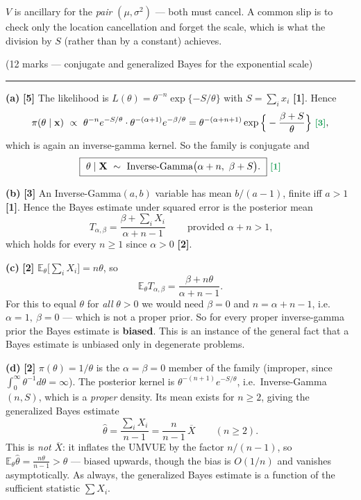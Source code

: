 \documentclass[11pt]{article}
\newcommand{\E}{\mathbb{E}}
\newcommand{\Xbar}{\overline{X}}
\newcommand{\mk}[1]{{\small\color{ForestGreen}\textbf{[#1]}}}
\newcommand{\qhead}[2]{\bigskip\noindent{\large\bfseries Question #1}\quad\textnormal{\small(#2)}\par
  \vspace{2pt}\hrule\vspace{6pt}}
\begin{document}
\begin{trapbox}
$V$ is ancillary for the \emph{pair} $(\mu,\sigma^2)$ --- both must cancel. A common slip is
to check only the location cancellation and forget the scale, which is what the division by
$S$ (rather than by a constant) achieves.
\end{trapbox}

\qhead{5}{12 marks --- conjugate and generalized Bayes for the exponential scale}

\noindent\textbf{(a)} \mk{5}
The likelihood is $L(\theta)=\theta^{-n}\exp\{-S/\theta\}$ with $S=\sum_ix_i$ \mk{1}. Hence
\[
\pi(\theta\mid\mathbf x)\ \propto\ \theta^{-n}e^{-S/\theta}\cdot\theta^{-(\alpha+1)}e^{-\beta/\theta}
=\theta^{-(\alpha+n+1)}\exp\Big\{-\frac{\beta+S}{\theta}\Big\}\ \mk{3},
\]
which is again an inverse-gamma kernel. So the family is conjugate and
\[
\boxed{\ \theta\mid\mathbf X\ \sim\ \text{Inverse-Gamma}\big(\alpha+n,\ \beta+S\big).\ }\ \mk{1}
\]

\smallskip\noindent\textbf{(b)} \mk{3}
An Inverse-Gamma$(a,b)$ variable has mean $b/(a-1)$, finite iff $a>1$ \mk{1}. Hence the Bayes
estimate under squared error is the posterior mean
\[
\boxed{\ T_{\alpha,\beta}=\frac{\beta+\sum_iX_i}{\alpha+n-1}\ }\qquad\text{provided }\alpha+n>1,
\]
which holds for every $n\ge1$ since $\alpha>0$ \mk{2}.

\smallskip\noindent\textbf{(c)} \mk{2}
$\E_\theta\big[\sum_iX_i\big]=n\theta$, so
\[
\E_\theta T_{\alpha,\beta}=\frac{\beta+n\theta}{\alpha+n-1}.
\]
For this to equal $\theta$ for \emph{all} $\theta>0$ we would need $\beta=0$ and
$n=\alpha+n-1$, i.e.\ $\alpha=1,\ \beta=0$ --- which is not a proper prior. So for every
proper inverse-gamma prior the Bayes estimate is \textbf{biased}. This is an instance of the
general fact that a Bayes estimate is unbiased only in degenerate problems.

\smallskip\noindent\textbf{(d)} \mk{2}
$\pi(\theta)=1/\theta$ is the $\alpha=\beta=0$ member of the family (improper, since
$\int_0^\infty\theta^{-1}d\theta=\infty$). The posterior kernel is
$\theta^{-(n+1)}e^{-S/\theta}$, i.e.\ Inverse-Gamma$(n,S)$, which is a \emph{proper} density.
Its mean exists for $n\ge2$, giving the generalized Bayes estimate
\[
\boxed{\ \widehat\theta=\frac{\sum_iX_i}{n-1}=\frac{n}{n-1}\,\Xbar\qquad(n\ge2).\ }
\]
This is \emph{not} $\Xbar$: it inflates the UMVUE by the factor $n/(n-1)$, so
$\E_\theta\widehat\theta=\frac{n\theta}{n-1}>\theta$ --- biased upwards, though the bias is
$O(1/n)$ and vanishes asymptotically. As always, the generalized Bayes estimate is a function
of the sufficient statistic $\sum X_i$.
\end{document}
